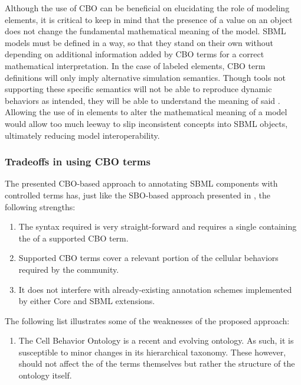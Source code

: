 Although the use of CBO can be beneficial on elucidating the role of modeling elements, it is critical to keep in mind that the presence of a  value on an object does not change the fundamental mathematical meaning of the model. SBML models must be defined in a way, so that they stand on their own without depending on additional information added by CBO terms for a correct mathematical interpretation. In the case of labeled \Event elements, CBO term definitions will only imply alternative simulation semantics. Though tools not supporting these specific \Event semantics will not be able to reproduce dynamic behaviors as intended, they will be able to understand the meaning of said \Event. Allowing the use of  in \Event elements to alter the mathematical meaning of a model would allow too much leeway to slip inconsistent concepts into SBML objects, ultimately reducing model interoperability.

\subsubsection{Tradeoffs in using CBO terms}
\label{subsec:tradeoffCBO}

The presented CBO-based approach to annotating SBML \Event components with controlled terms has, just like the SBO-based approach presented in \sbmlthreecore, the following strengths:

\begin{enumerate}
	\item The syntax required is very straight-forward and requires a single  containing the  of a supported CBO term.
	\item Supported CBO terms cover a relevant portion of the cellular behaviors required by the community.
	\item It does not interfere with already-existing annotation schemes implemented by either Core and SBML extensions.
\end{enumerate}

The following list illustrates some of the weaknesses of the proposed approach:

\begin{enumerate}
	\item The Cell Behavior Ontology is a recent and evolving ontology. As such, it is susceptible to minor changes in its hierarchical taxonomy. These however, should not affect the  of the terms themselves but rather the structure of the ontology itself.
\end{enumerate}

